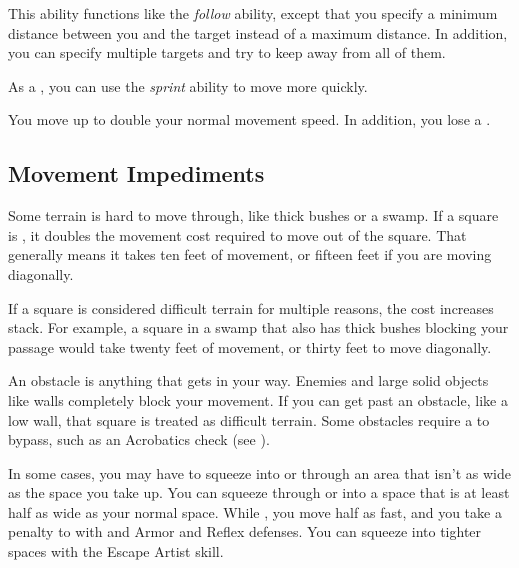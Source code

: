         \begin{freeability}{}
            This ability functions like the \textit{follow} ability, except that you specify a minimum distance between you and the target instead of a maximum distance.
            In addition, you can specify multiple targets and try to keep away from all of them.
        \end{freeability}

         As a , you can use the \textit{sprint} ability to move more quickly.

        \begin{freeability}{}
            You move up to double your normal movement speed.
            In addition, you lose a .
        \end{freeability}

    \subsection{Movement Impediments}

        \label{Difficult Terrain}
        Some terrain is hard to move through, like thick bushes or a swamp.
        If a square is , it doubles the movement cost required to move out of the square.
        That generally means it takes ten feet of movement, or fifteen feet if you are moving diagonally.

        If a square is considered difficult terrain for multiple reasons, the cost increases stack.
        For example, a square in a swamp that also has thick bushes blocking your passage would take twenty feet of movement, or thirty feet to move diagonally.

        An obstacle is anything that gets in your way. Enemies and large solid objects like walls completely block your movement. If you can get past an obstacle, like a low wall, that square is treated as difficult terrain. Some obstacles require a  to bypass, such as an Acrobatics check (see ).

        \label{Squeezing}
        In some cases, you may have to squeeze into or through an area that isn't as wide as the space you take up.
        You can squeeze through or into a space that is at least half as wide as your normal space.
        While , you move half as fast, and you take a  penalty to  with  and Armor and Reflex defenses.
        You can squeeze into tighter spaces with the Escape Artist skill.

